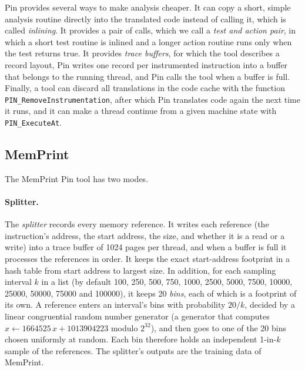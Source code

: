 \documentclass[11pt]{article}
\newcommand{\memprint}{MemPrint}
\newcommand{\term}[1]{\emph{#1}}
\begin{document}
Pin provides several ways to make analysis cheaper. It can copy a short, simple analysis routine directly into the translated code instead of calling it, which is called \term{inlining}. It provides a pair of calls, which we call a \term{test and action pair}, in which a short test routine is inlined and a longer action routine runs only when the test returns true. It provides \term{trace buffers}, for which the tool describes a record layout, Pin writes one record per instrumented instruction into a buffer that belongs to the running thread, and Pin calls the tool when a buffer is full. Finally, a tool can discard all translations in the code cache with the function \texttt{PIN\_RemoveInstrumentation}, after which Pin translates code again the next time it runs, and it can make a thread continue from a given machine state with \texttt{PIN\_ExecuteAt}.

\subsection{\memprint{}}
\label{sec:memprint}

The \memprint{} Pin tool has two modes.

\paragraph{Splitter.}
The \term{splitter} records every memory reference. It writes each reference (the instruction's address, the start address, the size, and whether it is a read or a write) into a trace buffer of 1024 pages per thread, and when a buffer is full it processes the references in order. It keeps the exact start-address footprint in a hash table from start address to largest size. In addition, for each sampling interval $k$ in a list (by default 100, 250, 500, 750, 1000, 2500, 5000, 7500, 10000, 25000, 50000, 75000 and 100000), it keeps 20 \term{bins}, each of which is a footprint of its own. A reference enters an interval's bins with probability $20/k$, decided by a linear congruential random number generator (a generator that computes $x \leftarrow 1664525\,x + 1013904223$ modulo $2^{32}$), and then goes to one of the 20 bins chosen uniformly at random. Each bin therefore holds an independent 1-in-$k$ sample of the references. The splitter's outputs are the training data of \memprint{}.
\end{document}

